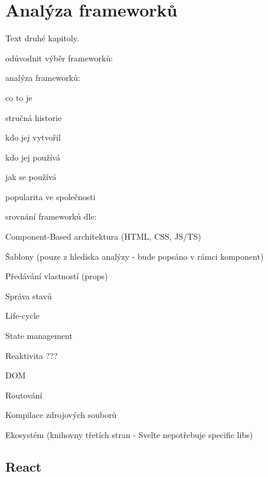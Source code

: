 \section{Analýza frameworků}

Text druhé kapitoly.

\begin{citemize}
	\item odůvodnit výběr frameworků:
	\begin{citemize}
		\item {}
	\end{citemize}

	\item analýza frameworků:
	\begin{citemize}
		\item co to je
		\item stručná historie
		\item kdo jej vytvořil
		\item kdo jej používá
		\item jak se používá
		\item popularita ve společnosti
	\end{citemize}

	\item srovnání frameworků dle:
	\begin{cenumerate}
		\item Component-Based architektura (HTML, CSS, JS/TS)
		\item Šablony (pouze z hlediska analýzy - bude popsáno v rámci komponent)
		\item Předávání vlastností (props)
		\item Správa stavů
		\item Life-cycle
		\item State management
		\item Reaktivita ???
		\item DOM %
		\item Routování
		\item Kompilace zdrojových souborů %
		\item Ekosystém (knihovny třetích stran - Svelte nepotřebuje specific libs)
	\end{cenumerate}
\end{citemize}


\subsection{React}

